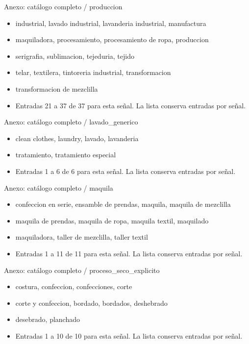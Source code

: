 \documentclass[aspectratio=169,10pt]{beamer}
\begin{document}
\begin{frame}{Anexo: catálogo completo / produccion}
\small
\begin{itemize}
\item industrial, lavado industrial, lavanderia industrial, manufactura
\item maquiladora, procesamiento, procesamiento de ropa, produccion
\item serigrafia, sublimacion, tejeduria, tejido
\item telar, textilera, tintoreria industrial, transformacion
\item transformacion de mezclilla
\item Entradas 21 a 37 de 37 para esta señal. La lista conserva entradas por señal.
\end{itemize}
\end{frame}
\begin{frame}{Anexo: catálogo completo / lavado\_generico}
\small
\begin{itemize}
\item clean clothes, laundry, lavado, lavanderia
\item tratamiento, tratamiento especial
\item Entradas 1 a 6 de 6 para esta señal. La lista conserva entradas por señal.
\end{itemize}
\end{frame}
\begin{frame}{Anexo: catálogo completo / maquila}
\small
\begin{itemize}
\item confeccion en serie, ensamble de prendas, maquila, maquila de mezclilla
\item maquila de prendas, maquila de ropa, maquila textil, maquilado
\item maquiladora, taller de mezclilla, taller textil
\item Entradas 1 a 11 de 11 para esta señal. La lista conserva entradas por señal.
\end{itemize}
\end{frame}
\begin{frame}{Anexo: catálogo completo / proceso\_seco\_explicito}
\small
\begin{itemize}
\item costura, confeccion, confecciones, corte
\item corte y confeccion, bordado, bordados, deshebrado
\item desebrado, planchado
\item Entradas 1 a 10 de 10 para esta señal. La lista conserva entradas por señal.
\end{itemize}
\end{frame}
\end{document}
